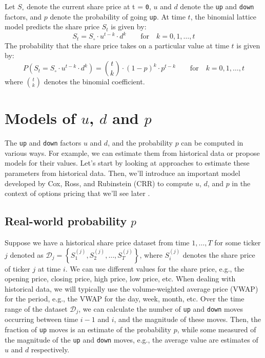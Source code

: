 \documentclass[11pt]{article}
\theoremstyle{definition}
\begin{document}
\begin{definition}\label{defn-binomial-distribution}
	Let $S_{\circ}$ denote the current share price at t = \texttt{0}, $u$ and $d$ denote the \texttt{up} and \texttt{down} factors, 
	and $p$ denote the probability of going \texttt{up}.
	At time $t$, the binomial lattice model predicts the share price $S_{t}$ is given by:
	\begin{equation*}
	S_{t} = S_{\circ}\cdot{u}^{t-k}\cdot{d}^{k}\qquad\text{for}\quad{k=0,1,\dots,t}
	\end{equation*}
	The probability that the share price takes on a particular value at time $t$ is given by:
	\begin{equation*}
	P(S_{t} = S_{\circ}\cdot{u}^{t-k}\cdot{d}^{k}) = \binom{t}{k}\cdot{(1-p)}^{k}\cdot{p}^{t-k}\qquad\text{for}\quad{k=0,1,\dots,t}
	\end{equation*}
	where $\binom{t}{k}$ denotes the binomial coefficient.
\end{definition}

\section*{Models of $u$, $d$ and $p$}
The \texttt{up} and \texttt{down} factors $u$ and $d$, and the probability $p$ can be computed in various ways.  
For example, we can estimate them from historical data or propose models for their values. 
Let's start by looking at approaches to estimate these parameters from historical data. Then, we'll introduce an important model developed by Cox, Ross, and Rubinstein (CRR) to compute $u$, $d$, and $p$ in the 
context of options pricing that we'll see later \citep{COX1979229}.

\subsection*{Real-world probability $p$}
Suppose we have a historical share price dataset from time $1,\dots, T$ for some ticker $j$ denoted as $\mathcal{D}_{j} = \left\{S^{(j)}_{1}, S^{(j)}_{2},\dots, S^{(j)}_{T}\right\}$, 
where $S^{(j)}_{i}$ denotes the share price of ticker $j$ at time $i$.
We can use different values for the share price, e.g., the opening price, closing price, high price, low price, etc. 
When dealing with historical data, we will typically use the volume-weighted average price (VWAP) for the period, 
e.g., the VWAP for the day, week, month, etc. Over the time range of the dataset $\mathcal{D}_{j}$, we can calculate the number of \texttt{up} and \texttt{down} moves
occurring between time $i-1$ and $i$, and the magnitude of these moves. 
Then, the fraction of \texttt{up} moves is an estimate of the probability $p$, 
while some measured of the magnitude of the \texttt{up} and \texttt{down} moves, e.g., the average value are estimates of $u$ and $d$ respectively.
\end{document}

